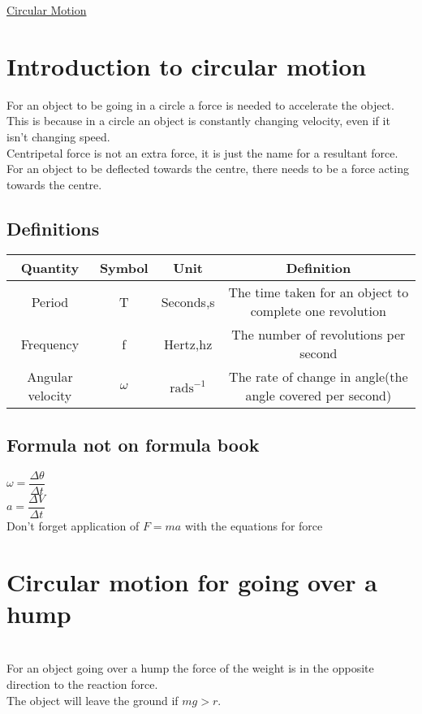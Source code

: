 \documentclass{article}[18pt]
\begin{document}
\begin{center}
\underline{\huge Circular Motion}
\end{center}
\section{Introduction to circular motion}
For an object to be going in a circle a force is needed to accelerate the object. This is because in a circle an object is constantly changing velocity, even if it isn't changing speed.\\
Centripetal force is not an extra force, it is just the name for a resultant force.\\
For an object to be deflected towards the centre, there needs to be a force acting towards the centre.
\subsection{Definitions}
\begin{tabular}{|c|c|c|c|}
\hline
Quantity&Symbol&Unit&Definition\\
\hline
Period&T&Seconds,s&The time taken for an object to complete one revolution\\
\hline
Frequency&f&Hertz,hz&The number of revolutions per second\\
\hline
Angular velocity&$\omega$&$\textrm{rads}^{-1}$&The rate of change in angle(the angle covered per second)\\
\hline
\end{tabular}
\subsection{Formula not on formula book}
$\omega=\dfrac{\Delta\theta}{\Delta t}$\\
$a=\dfrac{\Delta V}{\Delta t}$\\
Don't forget application of  $F=ma$ with the equations for force
\section{Circular motion for going over a hump}
\\
For an object going over a hump the force of the weight is in the opposite direction to the reaction force.\\
The object will leave the ground if $mg>r$.
\end{document}
